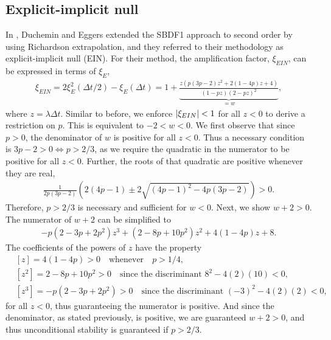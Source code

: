 \subsection{Explicit-implicit null}
\label{sect:ein}
In \cite{duchemin2014explicit}, Duchemin and Eggers extended the SBDF1 approach to second order by using Richardson extrapolation, and they referred to their methodology as explicit-implicit null (EIN). For their method, the amplification factor, $\xi_{EIN}$, can be expressed in terms of $\xi_E$, 
\begin{align}
\xi_{EIN} 
= 2\xi^2_{E}(\Delta t/2) - \xi_E(\Delta t) 
= 1 + \underbrace{\frac{z\left(p(3p-2)z^2 + 2(1-4p)z + 4 \right)}{(1 - pz)(2-pz)^2}}_{=w},
\label{ein amp fac}
\end{align} 
where $z = \lambda\Delta t$. Similar to before, we enforce $\left|\xi_{EIN}\right|<1$ for all $z<0$ to derive a restriction on $p$. This is equivalent to $-2 < w < 0$. We first observe that since $p>0$, the denominator of $w$ is positive for all $z<0$. Thus a necessary condition is $3p-2 > 0 \iff p>2/3$, as we require the quadratic in the numerator to be positive for all $z<0$. Further, the roots of that quadratic are positive whenever they are real,
\begin{align}
\frac{1}{2p(3p-2)}\left(2(4p-1) \pm  2\sqrt{(4p-1)^2 - 4p(3p-2)}\right) > 0.
\end{align} 
Therefore, $p>2/3$ is necessary and sufficient for $w<0$. Next, we show $w+2>0$. The numerator of $w+2$ can be simplified to 
\begin{align}
-p(2-3p+2p^2) z^3 + (2-8p+10p^2)z^2 + 4(1-4p)z + 8.
\end{align}
The coefficients of the powers of $z$ have the property
\begin{align*}
& [z] = 4(1-4p) > 0 \quad\text{whenever}\quad p > 1/4,
\\
&[z^2] = 2-8p + 10p^2 > 0 \quad\text{since the discriminant } 8^2 - 4(2)(10) < 0,
\\
&[z^3] = -p(2-3p+2p^2) > 0 \quad\text{since the discriminant } (-3)^2 - 4(2)(2) < 0,
\end{align*}
for all $z<0$, thus guaranteeing the numerator is positive. And since the denominator, as stated previously, is positive, we are guaranteed $w+2>0$, and thus unconditional stability is guaranteed if $p>2/3$.

